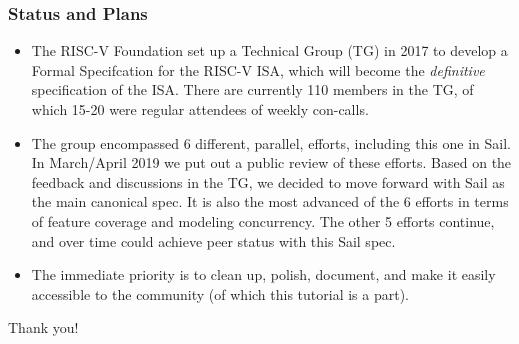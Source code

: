 \documentclass[aspectratio=169]{beamer}
\newcommand{\slidefont}{\scriptsize}
\begin{document}
\begin{frame}[fragile]
  \frametitle{Status and Plans}

  \slidefont

  \begin{itemize}
  \item
    The RISC-V Foundation set up a Technical Group (TG) in 2017 to
    develop a Formal Specifcation for the RISC-V ISA, which will
    become the \emph{definitive} specification of the ISA.  There are
    currently 110 members in the TG, of which 15-20 were regular
    attendees of weekly con-calls.

  \item 
    The group encompassed 6 different, parallel, efforts, including
    this one in Sail.  In March/April 2019 we put out a public review
    of these efforts.  Based on the feedback and discussions in the
    TG, we decided to move forward with Sail as the main canonical
    spec. It is also the most advanced of the 6 efforts in terms of
    feature coverage and modeling concurrency.  The other 5 efforts
    continue, and over time could achieve peer status with this Sail
    spec.

  \item
    The immediate priority is to clean up, polish, document, and make
    it easily accessible to the community (of which this tutorial is a
    part).

  \end{itemize}

\end{frame}


\begin{frame}[fragile]

  \slidefont

  \vfill

  \begin{center}\LARGE
    Thank you!
  \end{center}

  \vfill

\end{frame}

\end{document}
